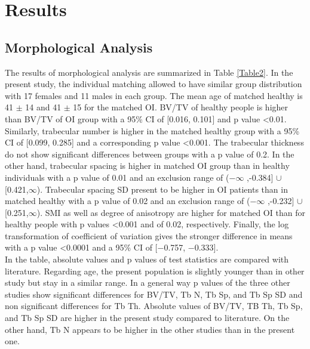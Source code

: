 \documentclass[a4paper,fleqn]{DC_ArtStyle}
\begin{document}
\section{Results}

\subsection{Morphological Analysis}
The results of morphological analysis are summarized in Table \ref{Table2}. In the present study, the individual matching allowed to have similar group distribution with 17 females and 11 males in each group. The mean age of matched healthy is 41 $\pm$ 14 and 41 $\pm$ 15 for the matched OI. BV/TV of healthy people is higher than BV/TV of OI group with a 95\% CI of [0.016, 0.101] and p value <0.01. Similarly, trabecular number is higher in the matched healthy group with a 95\% CI of [0.099, 0.285] and a corresponding p value <0.001. The trabecular thickness do not show significant differences between groups with a p value of 0.2. In the other hand, trabecular spacing is higher in matched OI group than in healthy individuals with a p value of 0.01 and an exclusion range of ($-\infty$ ,-0.384] $\cup$ [0.421,$\infty$). Trabecular spacing SD present to be higher in OI patients than in matched healthy with a p value of 0.02 and an exclusion range of ($-\infty$ ,-0.232] $\cup$ [0.251,$\infty$). SMI as well as degree of anisotropy are higher for matched OI than for healthy people with p values <0.001 and of 0.02, respectively. Finally, the log transformation of coefficient of variation gives the stronger difference in means with a p value <0.0001 and a 95\% CI of [−0.757, −0.333].\\

In the table, absolute values and p values of test statistics are compared with literature. Regarding age, the present population is slightly younger than in other study but stay in a similar range. In a general way p values of the three other studies show significant differences for BV/TV, Tb N, Tb Sp, and Tb Sp SD and non significant differences for Tb Th. Absolute values of BV/TV, TB Th, Tb Sp, and Tb Sp SD are higher in the present study compared to literature. On the other hand, Tb N appears to be higher in the other studies than in the present one.
\end{document}
